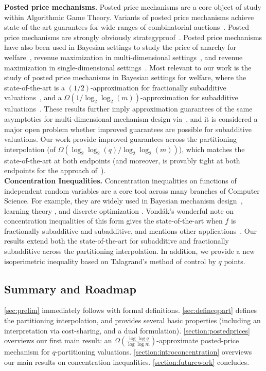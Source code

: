\documentclass[11pt]{article}%
\numberwithin{theorem}{subsection}
\begin{document}
\noindent\textbf{Posted price mechanisms.} Posted price mechanisms are a core object of study within Algorithmic Game Theory. Variants of posted price mechanisms achieve state-of-the-art guarantees for wide ranges of combinatorial auctions~\cite{AssadiKS21,DobzinskiNS12}. Posted price mechanisms are strongly obviously strategyproof~\cite{Li17,PyciaT19}. Posted price mechanisms have also been used in Bayesian settings to study the price of anarchy for welfare~\cite{FeldmanGL15,DuttingFKL20,DuttingKL20}, revenue maximization in multi-dimensional settings~\cite{ChawlaHMS10,KleinbergW19,ChawlaM16, CaiZ17}, and revenue maximization in single-dimensional settings~\cite{Yan11,AlaeiHNPY15,FengHL19, JinLQTX19,JinLTX19,JinJLZ21}. Most relevant to our work is the study of posted price mechanisms in Bayesian settings for welfare, where the state-of-the-art is a $(1/2)$-approximation for fractionally subadditive valuations~\cite{FeldmanGL15}, and a $\Omega(1/\log_2\log_2(m))$-approximation for subadditive valuations~\cite{DuttingKL20}. These results further imply approximation guarantees of the same asymptotics for multi-dimensional mechanism design via~\cite{CaiZ17}, and it is considered a major open problem whether improved guarantees are possible for subadditive valuations. Our work provide improved guarantees across the partitioning interpolation (of $\Omega(\log_2\log_2 (q)/\log_2\log_2(m))$), which matches the state-of-the-art at both endpoints (and moreover, is provably tight at both endpoints for the approach of~\cite{DuttingKL20}).\\ 

\noindent\textbf{Concentration Inequalities.} Concentration inequalities on functions of independent random variables are a core tool across many branches of Computer Science. For example, they are widely used in Bayesian mechanism design~\cite{RubinsteinW18,ChawlaM16, CaiZ17, KothariMSSW19}, learning theory
\cite{BalcanH11,FeldmanV13}, and discrete optimization \cite{FairsteinKS21}. Vond\'{a}k's wonderful note on concentration inequalities of this form gives the state-of-the-art when $f$ is fractionally subadditive and subadditive, and mentions other applications~\cite{Vondrak10}. Our results extend both the state-of-the-art for subadditive and fractionally subadditive across the partitioning interpolation. In addition, we provide a new isoperimetric inequality based on Talagrand's method of control by $q$ points.

\subsection{Summary and Roadmap}
\cref{sec:prelim} immediately follows with formal definitions. \cref{sec:defineqpart} defines the partitioning interpolation, and provides several basic properties (including an interpretation via cost-sharing, and a dual formulation). \cref{section:postedprices} overviews our first main result: an $\Omega(\frac{\log\log q}{\log \log m})$-approximate posted-price mechanism for $q$-partitioning valuations. \cref{section:introconcentration} overviews our main results on concentration inequalities. \cref{section:futurework} concludes.
\end{document}
